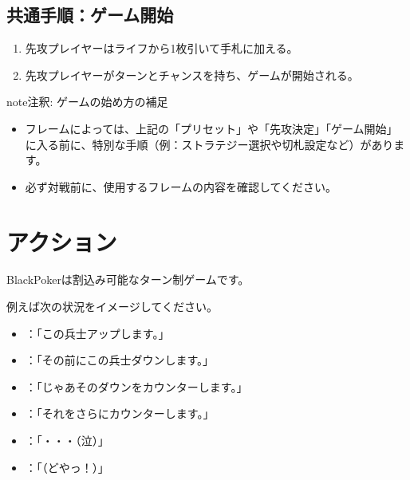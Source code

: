 \documentclass[letterpaper,10pt,dvipdfmx]{sphinxmanual}
\renewcommand{\spxentry}{\item}
\begin{document}
\subsection{共通手順：ゲーム開始}
\label{\detokenize{common/common:common-gamestart-start}}\label{\detokenize{common/common:id16}}\begin{enumerate}
%
\item {} 
\sphinxAtStartPar
先攻プレイヤーはライフから1枚引いて手札に加える。

\item {} 
\sphinxAtStartPar
先攻プレイヤーがターンとチャンスを持ち、ゲームが開始される。

\end{enumerate}

\begin{sphinxadmonition}{note}{注釈:}
\sphinxAtStartPar
ゲームの始め方の補足
\begin{itemize}
\item {} 
\sphinxAtStartPar
フレームによっては、上記の「プリセット」や「先攻決定」「ゲーム開始」に入る前に、特別な手順（例：ストラテジー選択や切札設定など）があります。

\item {} 
\sphinxAtStartPar
必ず対戦前に、使用するフレームの内容を確認してください。

\end{itemize}
\end{sphinxadmonition}

\index{アクション@\spxentry{アクション}}\ignorespaces 

\section{アクション}
\label{\detokenize{common/common:index-14}}\label{\detokenize{common/common:id17}}
\sphinxAtStartPar
BlackPokerは割込み可能なターン制ゲームです。

\sphinxAtStartPar
例えば次の状況をイメージしてください。
\begin{itemize}
\item {} 
\sphinxAtStartPar
{}：「この兵士アップします。」

\item {} 
\sphinxAtStartPar
{}：「その前にこの兵士ダウンします。」

\item {} 
\sphinxAtStartPar
{}：「じゃあそのダウンをカウンターします。」

\item {} 
\sphinxAtStartPar
{}：「それをさらにカウンターします。」

\item {} 
\sphinxAtStartPar
{}：「・・・（泣）」

\item {} 
\sphinxAtStartPar
{}：「（どやっ！）」

\end{itemize}
\end{document}
